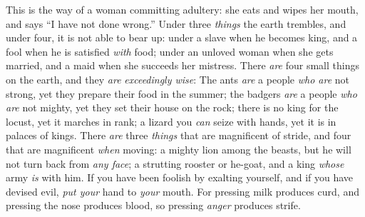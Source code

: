 \begin{biblechapter}
\verse This is the way of a woman committing adultery: 
she eats and wipes her mouth, 
and says “I have not done wrong.”
\verse Under three \textit{things} the earth trembles, 
and under four, it is not able to bear up:
\verse under a slave when he becomes king, 
and a fool when he is satisfied \textit{with} food;
\verse under an unloved woman when she gets married, 
and a maid when she succeeds her mistress.
\verse There \textit{are} four small things on the earth, 
and they \textit{are} \textit{exceedingly wise}:
\verse The ants \textit{are} a people \textit{who are} not strong, 
yet they prepare their food in the summer;
\verse the badgers \textit{are} a people \textit{who are} not mighty, 
yet they set their house on the rock;
\verse there is no king for the locust, 
yet it marches in rank;
\verse a lizard you \textit{can} seize with hands, 
yet it is in palaces of kings.
\verse There \textit{are} three \textit{things} that are magnificent of stride, 
and four that are magnificent \textit{when} moving:
\verse a mighty lion among the beasts, 
but he will not turn back from \textit{any face};
\verse a strutting rooster or he-goat, 
and a king \textit{whose} army \textit{is} with him.
\verse If you have been foolish by exalting yourself, 
and if you have devised evil, \textit{put your} hand to \textit{your} mouth.
\verse For pressing milk produces curd, 
and pressing the nose produces blood, 
so pressing \textit{anger} produces strife.
\end{biblechapter}


